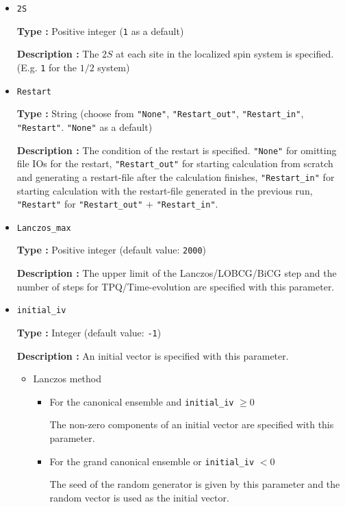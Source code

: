 \begin{itemize}
\item \verb|2S|

{\bf Type :} Positive integer (\verb|1| as a default)

{\bf Description :} The $2 S$ at each site in the localized spin system is specified.
(E.g. \verb|1| for the $1/2$ system)

\item \verb|Restart|

  {\bf Type :} String (choose from \verb|"None"|, \verb|"Restart_out"|, \verb|"Restart_in"|,  
  \verb|"Restart"|. \verb|"None"| as a default)

  {\bf Description :} The condition of the restart is specified.
  \verb|"None"| for omitting file IOs for the restart,
  \verb|"Restart_out"| for starting calculation from scratch
  and generating a restart-file after the calculation finishes,
  \verb|"Restart_in"| for starting calculation with the
  restart-file generated in the previous run,
  \verb|"Restart"| for \verb|"Restart_out"| + \verb|"Restart_in"|.

\item \verb|Lanczos_max|

{\bf Type :} Positive integer (default value: \verb|2000|)

{\bf Description :} The upper limit of the Lanczos/LOBCG/BiCG step
and the number of steps for TPQ/Time-evolution are specified with this parameter.

\item \verb|initial_iv|

{\bf Type :} Integer (default value: \verb|-1|)

{\bf Description :} 
{An initial vector is specified with this parameter.}
\begin{itemize}
\item{Lanczos method}
\begin{itemize}
\item{For the canonical ensemble and \verb|initial_iv| $\geq 0$}

The non-zero components of an initial vector are specified with this parameter. 

\item{For the grand canonical ensemble or \verb|initial_iv| $< 0$}

The seed of the random generator is given by this parameter and the random vector is used as the initial vector.
\end{itemize}


\end{itemize}
\end{itemize}
